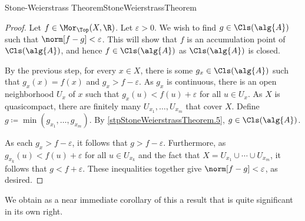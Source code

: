 \begin{thm}{Stone-Weierstrass Theorem}{StoneWeierstrassTheorem}
\begin{proof}
Let $f\in \Mor _{\Top}(X,\R )$.  Let $\varepsilon >0$.  We wish to find $g\in \Cls (\alg{A})$ such that $\norm[f-g]<\varepsilon$.  This will show that $f$ is an accumulation point of $\Cls (\alg{A})$, and hence $f\in \Cls (\alg{A})$ as $\Cls (\alg{A})$ is closed.

By the previous step, for every $x\in X$, there is some $g_x\in \Cls (\alg{A})$ such that $g_x(x)=f(x)$ and $g_x>f-\varepsilon$.  As $g_x$ is continuous, there is an open neighborhood $U_x$ of $x$ such that $g_x(u)<f(u)+\varepsilon$ for all $u\in U_x$.  As $X$ is quasicompact, there are finitely many $U_{x_1},\ldots ,U_{x_m}$ that cover $X$.  Define $g\coloneqq \min (g_{x_1},\ldots ,g_{x_m})$.  By \cref{stpStoneWeierstrassTheorem.5}, $g\in \Cls (\alg{A})$.

As each $g_x>f-\varepsilon$, it follows that $g>f-\varepsilon$.  Furthermore, as $g_{x_k}(u)<f(u)+\varepsilon$ for all $u\in U_{x_k}$ and the fact that $X=U_{x_1}\cup \cdots \cup U_{x_m}$, it follows that $g<f+\varepsilon$.  These inequalities together give $\norm[f-g]<\varepsilon$, as desired.
\end{proof}
\end{thm}
We obtain as a near immediate corollary of this a result that is quite significant in its own right.
